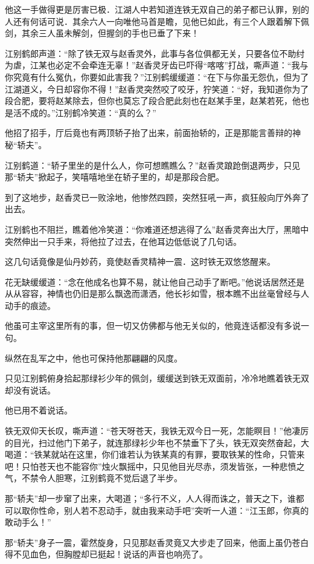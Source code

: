 \documentclass[12pt,oneside]{book}
\begin{document}
他这一手做得更是厉害已极．江湖人中若知道连铁无双自己的弟子都已认罪，别的人还有何话可说．其余六人一向唯他马首是瞻，见他已如此，有三个人跟着解下佩剑，其余三人虽未解剑，但握剑的手也已垂了下来！

江别鹤郎声道：``除了铁无双与赵香灵外，此事与各位俱都无关，只要各位不助纣为虐，江某也必定不会牵连无辜！''赵香灵牙齿已吓得``喀喀''打战，嘶声道：``我与你究竟有什么冤仇，你要如此害我？''江别鹤缓缓道：``在下与你虽无怨仇，但为了江湖道义，今日却容你不得！''赵香灵突然咬了咬牙，狞笑道：``好，我知道你为了段合肥，要将赵某除去，但你也莫忘了段合肥此刻也在赵某手里，赵某若死，他也是活不成的。''江别鹤冷笑道：``真的么？''

他招了招手，厅后竟也有两顶轿子抬了出来，前面抬轿的，正是那能言善辩的神秘``轿夫''。

江别鹤道：``轿子里坐的是什么人，你可想瞧瞧么？''赵香灵踉跄倒退两步，只见那``轿夫''掀起子，笑嘻嘻地坐在轿子里的，却是那段合肥。

到了这地步，赵香灵已一败涂地，他惨然四顾，突然狂吼一声，疯狂般向厅外奔了出去。

江别鹤也不阻拦，瞧着他冷笑道：``你难道还想逃得了么''赵香灵奔出大厅，黑暗中突然伸出一只手来，将他拉了过去，在他耳边低低说了几句话。

这几句话竟像是仙丹妙药，竟使赵香灵精神一震．这时铁无双悠悠醒来。

花无缺缓缓道：``念在他成名也算不易，就让他自己动手了断吧。''他说话居然还是从从容容，神情也仍旧是那么飘逸而潇洒，他长衫如雪，根本瞧不出丝毫曾经与人动手的痕迹。

他虽可主宰这里所有的事，但一切又仿佛都与他无关似的，他竟连话都没有多说一句。

纵然在乱军之中，他也可保持他那翩翩的风度。

只见江别鹤俯身拾起那绿衫少年的佩剑，缓缓送到铁无双面前，冷冷地瞧着铁无双却没有说话。

他已用不着说话。

铁无双仰天长叹，嘶声道：``苍天呀苍天，我铁无双今日一死，怎能瞑目！''他凄厉的目光，扫过他门下弟子，就连那绿衫少年也不禁垂下了头，铁无双突然奋起，大喝道：``铁某就站在这里，你们谁若认为铁某真的有罪，要取铁某的性命，只管来吧！只怕苍天也不能容你''烛火飘摇中，只见他目光尽赤，须发皆张，一种悲愤之气，不禁令人胆寒，江别鹤竟不觉后退了半步。

那``轿夫''却一步窜了出来，大喝道；``多行不义，人人得而诛之，普天之下，谁都可以取你性命，别人若不忍动手，就由我来动手吧''突听一人道：``江玉郎，你真的敢动手么！''

那``轿夫''身子一震，霍然旋身，只见那赵香灵竟又大步走了回来，他面上虽仍苍白得不见血色，但胸膛却已挺起！说话的声音也响亮了。
\end{document}
